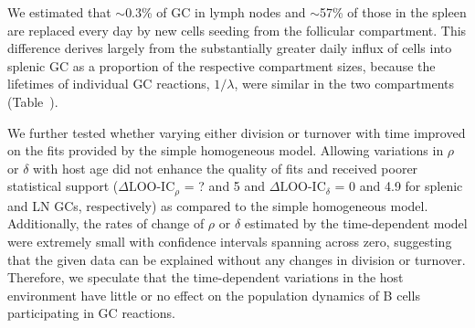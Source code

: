 \documentclass[11pt,onecolumn]{article}
\newcommand{\red}[1]{{\color{red}{#1}}}
\newcommand{\looic}{\ensuremath{\Delta \text{LOO-IC}}}
\begin{document}
{%
We estimated that $\sim$0.3\% of  GC in lymph nodes and $\sim$57\% of those in the spleen are replaced every day by new cells seeding from the follicular compartment. \red{These conclusions all subject to change} This difference derives largely from the substantially greater daily influx of cells into splenic GC as a proportion of the respective compartment sizes, because the lifetimes of individual GC reactions, $1/\lambda$, were similar in the two compartments (Table~\red{???}). \red{Andy comment 2018-12-17; Need to be careful.  Percent replacement per day is determined by both $1/\lambda$ (how long each reaction lasts  = clone lifetime) and influx (which gives the number of reactions initiated per day). Let's hold off on conclusions till sanket analysis done }

We further tested whether varying either division or turnover with time improved on the fits provided by the simple homogeneous model. 
Allowing variations in $\rho$ or $\delta$ with host age did not enhance the quality of fits and received poorer statistical support ({\looic}$_{\rho}$ = ? and 5 and {\looic}$_{\delta}$ = 0 and 4.9  for splenic and LN GCs, respectively) as compared to the simple homogeneous model. 
Additionally, the rates of change of $\rho$ or $\delta$ estimated by the time-dependent model were extremely small with confidence intervals spanning across zero, suggesting that the given data can be explained without any changes in division or turnover. %
Therefore, we speculate that the time-dependent variations in the host environment have little or no effect on the population dynamics of B cells participating in GC reactions.


}
\end{document}
